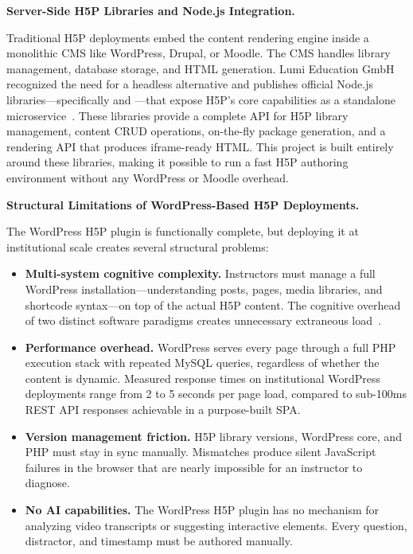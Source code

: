 \textbf{Server-Side H5P Libraries and Node.js Integration.}

Traditional H5P deployments embed the content rendering engine inside a monolithic CMS like WordPress, Drupal, or Moodle. The CMS handles library management, database storage, and HTML generation. Lumi Education GmbH recognized the need for a headless alternative and publishes official Node.js libraries---specifically  and ---that expose H5P's core capabilities as a standalone microservice~\cite{lumieducation2023}. These libraries provide a complete API for H5P library management, content CRUD operations, on-the-fly package generation, and a rendering API that produces iframe-ready HTML. This project is built entirely around these libraries, making it possible to run a fast H5P authoring environment without any WordPress or Moodle overhead.

\clearpage
\textbf{Structural Limitations of WordPress-Based H5P Deployments.}

The WordPress H5P plugin is functionally complete, but deploying it at institutional scale creates several structural problems:

\begin{itemize}
  \item \textbf{Multi-system cognitive complexity.} Instructors must manage a full WordPress installation---understanding posts, pages, media libraries, and shortcode syntax---on top of the actual H5P content. The cognitive overhead of two distinct software paradigms creates unnecessary extraneous load~\cite{sweller1988}.
  \item \textbf{Performance overhead.} WordPress serves every page through a full PHP execution stack with repeated MySQL queries, regardless of whether the content is dynamic. Measured response times on institutional WordPress deployments range from 2 to 5 seconds per page load, compared to sub-100ms REST API responses achievable in a purpose-built SPA.
  \item \textbf{Version management friction.} H5P library versions, WordPress core, and PHP must stay in sync manually. Mismatches produce silent JavaScript failures in the browser that are nearly impossible for an instructor to diagnose.
  \item \textbf{No AI capabilities.} The WordPress H5P plugin has no mechanism for analyzing video transcripts or suggesting interactive elements. Every question, distractor, and timestamp must be authored manually.
\end{itemize}

